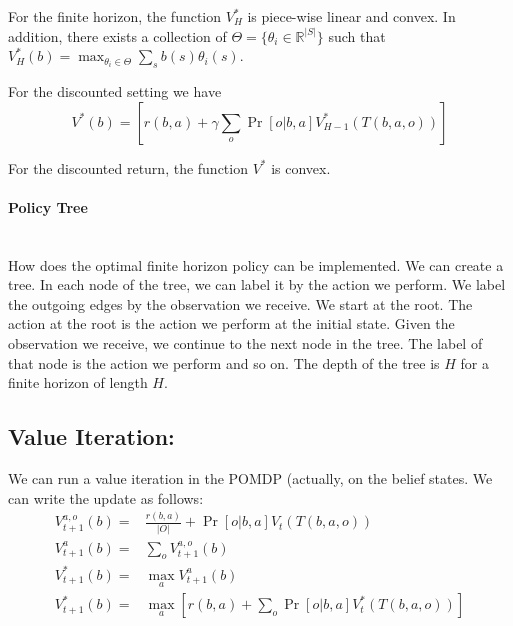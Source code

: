 \begin{theorem}
For the finite horizon, the function $V^*_H$ is piece-wise linear
and convex. In addition, there exists a collection of
$\Theta=\{\theta_i\in \mathbb{R}^{|S|}\}$ such that
$V^*_H(b)=\max_{\theta_i\in\Theta} \sum_s b(s)\theta_i(s)$.
\end{theorem}

For the discounted setting we have
\[
V^*(b)=[r(b,a)+\gamma\sum_o \Pr[o|b,a]V^*_{H-1}(T(b,a,o))]
\]
\begin{theorem}
For the discounted return, the function $V^*$ is convex.
\end{theorem}

\paragraph{Policy Tree}\ \\
How does the optimal finite horizon policy can be implemented. We
can create a tree. In each node of the tree, we can label it by the
action we perform. We label the outgoing edges by the observation we
receive. We start at the root. The action at the root is the action
we perform at the initial state. Given the observation we receive,
we continue to the next node in the tree. The label of that node is
the action we perform and so on. The depth of the tree is $H$ for a
finite horizon of length $H$.

\subsection{Value Iteration:}

We can run a value iteration in the POMDP (actually, on the belief
states. We can write the update as follows:
\begin{align*}
V^{a,o}_{t+1}(b)=&\frac{r(b,a)}{|O|}+\Pr[o|b,a]V_t(T(b,a,o))\\
V_{t+1}^a(b)=&\sum_o V^{a,o}_{t+1}(b)\\
V_{t+1}^*(b)=&\max_a V_{t+1}^a(b)\\
V_{t+1}^*(b) =& \max_a [r(b,a)+\sum_o \Pr[o|b,a]V_t^*(T(b,a,o))]
\end{align*}

